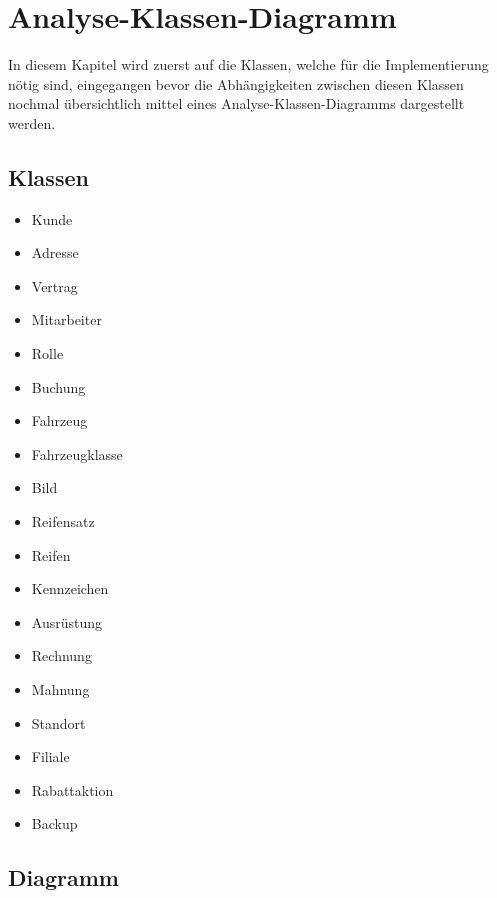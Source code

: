 \chapter{Analyse-Klassen-Diagramm}

In diesem Kapitel wird zuerst auf die Klassen, welche für die Implementierung nötig sind, eingegangen bevor die Abhängigkeiten zwischen diesen Klassen nochmal übersichtlich mittel eines Analyse-Klassen-Diagramms dargestellt werden.

\section{Klassen}
\begin{multicols}{2}
\begin{itemize}
    \item Kunde
    \item Adresse
    \item Vertrag
    \item Mitarbeiter
    \item Rolle
    \item Buchung
    \item Fahrzeug
    \item Fahrzeugklasse
    \item Bild
    \item Reifensatz
    \item Reifen
    \item Kennzeichen
    \item Ausrüstung
    \item Rechnung
    \item Mahnung
    \item Standort
    \item Filiale
    \item Rabattaktion
    \item Backup
\end{itemize}
\end{multicols}

\newpage

\section{Diagramm}

